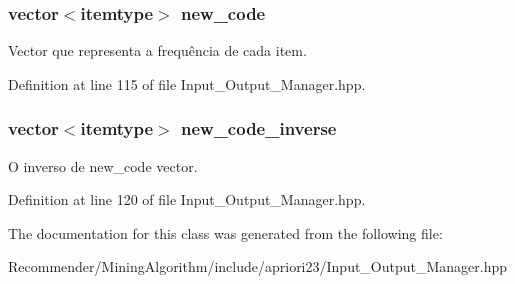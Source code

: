 \subsubsection{\setlength{\rightskip}{0pt plus 5cm}vector$<$itemtype$>$ {\bf new\_\-code}\hspace{0.3cm}{\tt  [private]}}\label{classInput__Output__Manager_4b455899d5a99cf9f5f68e6cad31dda9}


Vector que representa a frequência de cada item. 

Definition at line 115 of file Input\_\-Output\_\-Manager.hpp.
\subsubsection{\setlength{\rightskip}{0pt plus 5cm}vector$<$itemtype$>$ {\bf new\_\-code\_\-inverse}\hspace{0.3cm}{\tt  [private]}}\label{classInput__Output__Manager_8f17854f249d0dc72d69bdb7e469e16f}


O inverso de new\_\-code vector. 

Definition at line 120 of file Input\_\-Output\_\-Manager.hpp.

The documentation for this class was generated from the following file:\begin{CompactItemize}
\item 
Recommender/MiningAlgorithm/include/apriori23/Input\_\-Output\_\-Manager.hpp\end{CompactItemize}
